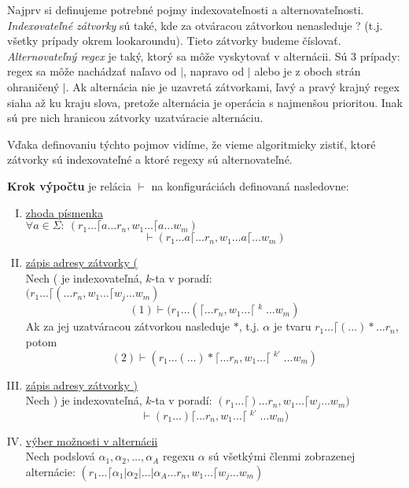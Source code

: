 \documentclass{svk_long_sk}
\begin{document}
Najprv si definujeme potrebné pojmy indexovateľnosti a alternovateľnosti. \textit{Indexovateľné zátvorky} sú také, kde za otváracou zátvorkou nenasleduje ? (t.j. všetky prípady okrem lookaroundu). Tieto zátvorky budeme číslovať. \textit{Alternovateľný regex} je taký, ktorý sa môže vyskytovať v alternácii. Sú 3 prípady: regex sa môže nachádzať naľavo od $|$, napravo od $|$ alebo je z oboch strán ohraničený $|$. Ak alternácia nie je uzavretá zátvorkami, ľavý a pravý krajný regex siaha až ku kraju slova, pretože alternácia je operácia s najmenšou prioritou. Inak sú pre nich hranicou zátvorky uzatváracie alternáciu.

Vďaka definovaniu týchto pojmov vidíme, že vieme algoritmicky zistiť, ktoré zátvorky sú indexovateľné a ktoré regexy sú alternovateľné.

\begin{definition}\label{dfkonfig}
\textbf{Krok výpočtu} je relácia $\vdash$ na konfiguráciách definovaná nasledovne:
\begin{enumerate}[I.]
\item \underline{zhoda písmenka}
\\ $\displaystyle \forall a \in \Sigma: ~(r_1 \dots \lceil a \dots r_n, w_1 \dots \lceil a \dots w_m)$ 
$$ \vdash (r_1 \dots a\lceil \dots r_n, w_1 \dots a \lceil \dots w_m)$$
\item \underline{zápis adresy zátvorky (}
\\ Nech ( je indexovateľná, $k$-ta v poradí: 
\\ $\displaystyle{ (r_1 \dots \lceil ( \dots r_n, w_1 \dots \lceil w_j \dots w_m)}$ 
$$ (1) \vdash (r_1 \dots (\lceil \dots r_n, w_1 \dots \lceil \mathop{w_j}^k \dots w_m)$$
Ak za jej uzatváracou zátvorkou nasleduje $*$, t.j. $\alpha$ je tvaru 
$\displaystyle r_1 \dots \lceil ( \dots ) * \dots r_n$, potom 
$$ (2) \vdash (r_1 \dots (\dots )* \lceil \dots r_n, w_1 \dots \lceil \mathop{\mathop{w_j}^k}^{k'} \dots w_m ) $$
\item \underline{zápis adresy zátvorky )}
\\ Nech ) je indexovateľná, $k$-ta v poradí: $\displaystyle (r_1 \dots \lceil ) \dots r_n, w_1 \dots \lceil w_j \dots w_m)$ 
$$ \vdash (r_1 \dots )\lceil \dots r_n, w_1 \dots \lceil \mathop{w_j}^{k'} \dots w_m)$$
\item \underline{výber možnosti v alternácii}
\\ Nech podslová $\alpha_1, \alpha_2,\dots,\alpha_A$ regexu $\alpha$ sú všetkými členmi zobrazenej alternácie: $(r_1 \dots \lceil \alpha_1 | \alpha_2 | \dots | \alpha_A \dots r_n, w_1\dots \lceil w_j \dots w_m)$

\end{enumerate}
\end{definition}
\end{document}
